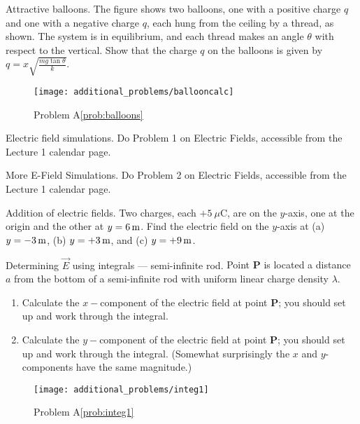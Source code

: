 \begin{aproblem}{Attractive balloons.}  
  The figure shows two balloons, one with a positive charge $q$ and
  one with a negative charge $q$, each hung from the ceiling by a
  thread, as shown.  The system is in equilibrium, and each thread
  makes an angle $\theta$ with respect to the vertical. Show that the
  charge $q$ on the balloons is given by $q =
  x\sqrt{\frac{mg\tan\theta}{k}}$.
  \label{prob:balloons}

  \begin{figure}[h]
    \begin{center}
      \texttt{[image: additional\_problems/ballooncalc]}
      \caption{Problem A\ref{prob:balloons}}
    \end{center}
  \end{figure}
\end{aproblem}


\begin{aproblem}{Electric field simulations.}  
  Do Problem 1 on Electric Fields, accessible from the Lecture 1
  calendar page.
\end{aproblem}


\begin{aproblem}{More E-Field Simulations.} 
  Do Problem 2 on Electric Fields, accessible from the Lecture 1
  calendar page.
\end{aproblem}

\begin{aproblem}{Addition of electric fields.} 
  Two charges, each $+5~\mu$C, are on the $y$-axis, one at the origin
  and the other at $y=6\,\mbox{m}$.  Find the electric field on the
  $y$-axis at (a) $y=-3\,\mbox{m}$, (b) $y = +3\,\mbox{m}$, and (c) $y =
  +9\,\mbox{m}$.
  \label{prob:addEfields}
\end{aproblem}

\newpage

\begin{aproblem}{Determining $\vec{E}$ using integrals --- semi-infinite rod.} 
  Point {\bf P} is located a distance $a$ from the bottom of a
  semi-infinite rod with uniform linear charge density $\lambda$.
    \begin{enumerate}
    \item Calculate the $x-$component of the electric field at point
      {\bf P}; you should set up and work through the integral.
    \item Calculate the $y-$component of the electric field at point
      {\bf P}; you should set up and work through the integral.
      (Somewhat surprisingly the $x$ and $y$-components have the same
      magnitude.)
    \end{enumerate}
    \label{prob:integ1}

    \begin{figure}[h]
      \begin{center}
        \texttt{[image: additional\_problems/integ1]}
        \caption{Problem A\ref{prob:integ1}}
      \end{center}
    \end{figure}
\end{aproblem}


